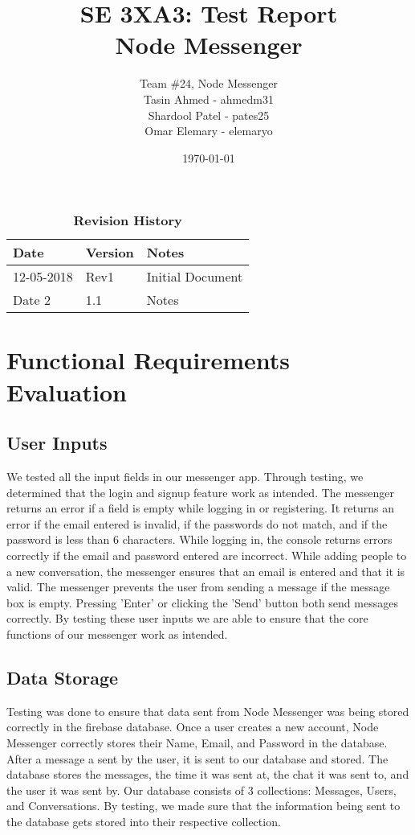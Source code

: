 \documentclass[12pt, titlepage]{article}
\title{SE 3XA3: Test Report\\Node Messenger}
\author{Team \#24, Node Messenger
		\\ Tasin Ahmed - ahmedm31
		\\ Shardool Patel - pates25
		\\ Omar Elemary - elemaryo
}
\date{\today}
\begin{document}
\maketitle

\tableofcontents
\listoftables
\listoffigures

\begin{table}[bp]
\caption{\bf Revision History}
\begin{tabularx}{\textwidth}{p{3cm}p{2cm}X}
\toprule {\bf Date} & {\bf Version} & {\bf Notes}\\
\midrule
12-05-2018 & Rev1 & Initial Document\\
Date 2 & 1.1 & Notes\\
\bottomrule
\end{tabularx}
\end{table}

\newpage



\newpage
\section{Functional Requirements Evaluation}
	\subsection{User Inputs}
	We tested all the input fields in our messenger app. Through testing, we determined that the login and signup feature work as intended. The messenger returns an error if a field is empty while logging in or registering. It returns an error if the email entered is invalid, if the passwords do not match, and if the password is less than 6 characters. While logging in, the console returns errors correctly if the email and password entered are incorrect. While adding people to a new conversation, the messenger ensures that an email is entered and that it is valid. The messenger prevents the user from sending a message if the message box is empty. Pressing 'Enter' or clicking the 'Send' button both send messages correctly. By testing these user inputs we are able to ensure that the core functions of our messenger work as intended.
	\subsection{Data Storage}
	Testing was done to ensure that data sent from Node Messenger was being stored correctly in the firebase database. Once a user creates a new account, Node Messenger correctly stores their Name, Email, and Password in the database. After a message a sent by the user, it is sent to our database and stored. The database stores the messages, the time it was sent at, the chat it was sent to, and the user it was sent by. Our database consists of 3 collections: Messages, Users, and Conversations. By testing, we made sure that the information being sent to the database gets stored into their respective collection.
\end{document}
